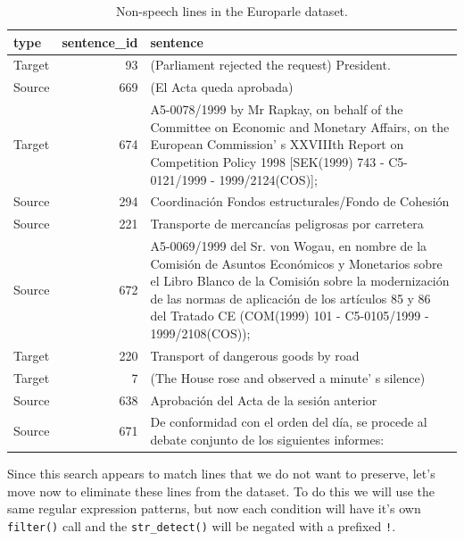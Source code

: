 \documentclass[
  letterpaper,
]{latex/krantz}
\newenvironment{Shaded}{\begin{snugshade}}{\end{snugshade}}
\newcommand{\AttributeTok}[1]{\textcolor[rgb]{0.40,0.45,0.13}{#1}}
\newcommand{\CommentTok}[1]{\textcolor[rgb]{0.37,0.37,0.37}{#1}}
\newcommand{\FunctionTok}[1]{\textcolor[rgb]{0.28,0.35,0.67}{#1}}
\newcommand{\NormalTok}[1]{\textcolor[rgb]{0.00,0.23,0.31}{#1}}
\newcommand{\OtherTok}[1]{\textcolor[rgb]{0.00,0.23,0.31}{#1}}
\newcommand{\SpecialCharTok}[1]{\textcolor[rgb]{0.37,0.37,0.37}{#1}}
\newcommand{\StringTok}[1]{\textcolor[rgb]{0.13,0.47,0.30}{#1}}
\begin{document}
\hypertarget{tbl-td-europarle-search-non-speech}{}
\begin{table}
\caption{\label{tbl-td-europarle-search-non-speech}Non-speech lines in the Europarle dataset. }\tabularnewline

\centering
\begin{tabular}{lrl}
\toprule
type & sentence\_id & sentence\\
\midrule
Target & 93 & (Parliament rejected the request) President.\\
Source & 669 & (El Acta queda aprobada)\\
Target & 674 & A5-0078/1999 by Mr Rapkay, on behalf of the Committee on Economic and Monetary Affairs, on the European Commission' s XXVIIIth Report on Competition Policy 1998 [SEK(1999) 743 - C5-0121/1999 - 1999/2124(COS)];\\
Source & 294 & Coordinación Fondos estructurales/Fondo de Cohesión\\
Source & 221 & Transporte de mercancías peligrosas por carretera\\
\addlinespace
Source & 672 & A5-0069/1999 del Sr. von Wogau, en nombre de la Comisión de Asuntos Económicos y Monetarios sobre el Libro Blanco de la Comisión sobre la modernización de las normas de aplicación de los artículos 85 y 86 del Tratado CE (COM(1999) 101 - C5-0105/1999 - 1999/2108(COS));\\
Target & 220 & Transport of dangerous goods by road\\
Target & 7 & (The House rose and observed a minute' s silence)\\
Source & 638 & Aprobación del Acta de la sesión anterior\\
Source & 671 & De conformidad con el orden del día, se procede al debate conjunto de los siguientes informes:\\
\bottomrule
\end{tabular}
\end{table}

Since this search appears to match lines that we do not want to
preserve, let's move now to eliminate these lines from the dataset. To
do this we will use the same regular expression patterns, but now each
condition will have it's own \texttt{filter()} call and the
\texttt{str\_detect()} will be negated with a prefixed \texttt{!}.

\begin{Shaded}
\end{Shaded}
\end{document}
